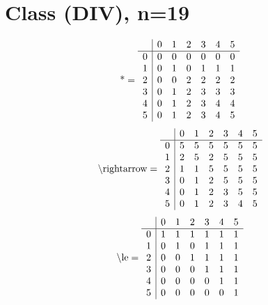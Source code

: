 \documentclass[11pt]{article}
\begin{document}
\section{Class (DIV), n=19}
\[\text{*} = 
\begin{array}{r | r r r r r r}
 & 0 & 1 & 2 & 3 & 4 & 5 \\ \hline
0 & 0 & 0 & 0 & 0 & 0 & 0 \\
1 & 0 & 1 & 0 & 1 & 1 & 1 \\
2 & 0 & 0 & 2 & 2 & 2 & 2 \\
3 & 0 & 1 & 2 & 3 & 3 & 3 \\
4 & 0 & 1 & 2 & 3 & 4 & 4 \\
5 & 0 & 1 & 2 & 3 & 4 & 5 \\
\end{array}
\]
\[\text{\textbackslash rightarrow} = 
\begin{array}{r | r r r r r r}
 & 0 & 1 & 2 & 3 & 4 & 5 \\ \hline
0 & 5 & 5 & 5 & 5 & 5 & 5 \\
1 & 2 & 5 & 2 & 5 & 5 & 5 \\
2 & 1 & 1 & 5 & 5 & 5 & 5 \\
3 & 0 & 1 & 2 & 5 & 5 & 5 \\
4 & 0 & 1 & 2 & 3 & 5 & 5 \\
5 & 0 & 1 & 2 & 3 & 4 & 5 \\
\end{array}
\]
\[\text{\textbackslash le} = 
\begin{array}{r | r r r r r r}
 & 0 & 1 & 2 & 3 & 4 & 5 \\ \hline
0 & 1 & 1 & 1 & 1 & 1 & 1 \\
1 & 0 & 1 & 0 & 1 & 1 & 1 \\
2 & 0 & 0 & 1 & 1 & 1 & 1 \\
3 & 0 & 0 & 0 & 1 & 1 & 1 \\
4 & 0 & 0 & 0 & 0 & 1 & 1 \\
5 & 0 & 0 & 0 & 0 & 0 & 1 \\
\end{array}
\]
\end{document}
